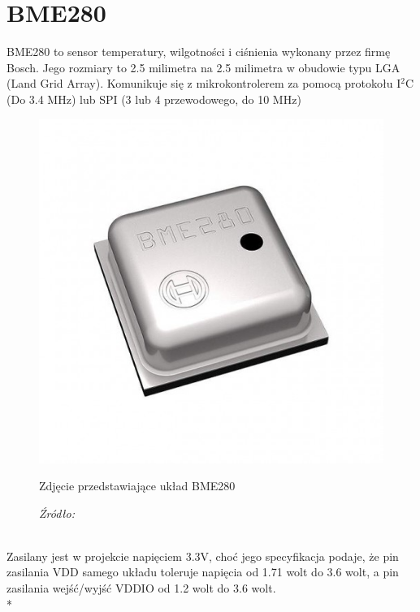 \documentclass[12pt,a4paper,oneside]{memoir}
\begin{document}
\section{BME280}
BME280 to sensor temperatury, wilgotności i ciśnienia wykonany przez firmę Bosch.
Jego rozmiary to 2.5 milimetra na 2.5 milimetra w obudowie typu LGA (Land Grid Array).
Komunikuje się z mikrokontrolerem za pomocą protokołu I$^2$C (Do 3.4 MHz) lub SPI (3 lub 4 przewodowego, do 10 MHz)
\begin{figure} [h]
	\centering
	\includegraphics[scale=0.4]{images/bme280.jpg}
	{\tytulyrozdzialow \footnotesize \caption[BME280]{Zdjęcie przedstawiające układ BME280}}
	\caption*{\textit{Źródło: \cite{bme280chip}}}
\end{figure}\\
Zasilany jest w projekcie napięciem 3.3V, choć jego specyfikacja podaje, że pin zasilania VDD samego układu toleruje napięcia od 1.71 wolt do 3.6 wolt, a pin zasilania wejść/wyjść VDDIO od 1.2 wolt do 3.6 wolt.\\*
\end{document}

